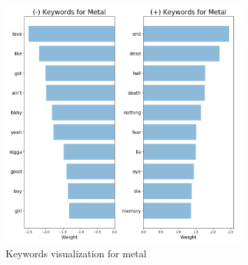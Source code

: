 \documentclass[a4paper,11pt]{article}
\begin{document}
\begin{figure}[h]
\begin{center}
\includegraphics[width=0.8\textwidth]{./img/metal-keywords.png}
\end{center}
\caption{Keywords visualization for metal}
\label{report}
\end{figure}

\end{document}
